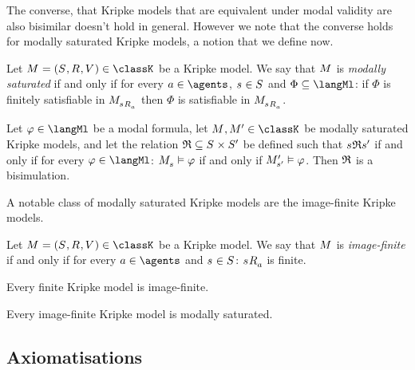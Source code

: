The converse, that Kripke models that are equivalent under modal validity are also bisimilar doesn't hold in general.
However we note that the converse holds for modally saturated Kripke models, a notion that we define now.

\begin{definition}
Let $\modelAndTuple \in \classK$ be a Kripke model.
We say that $\model$ is {\em modally saturated} if and only if for every $\agentA \in \agents$, $\stateS \in \states$ and $\Phi \subseteq \langMl$: if $\Phi$ is finitely satisfiable in $\pointedModel{\successors{\agentA}{\stateS}}$ then $\Phi$ is satisfiable in $\pointedModel{\successors{\agentA}{\stateS}}$.
\end{definition}

\begin{proposition}
Let $\phi \in \langMl$ be a modal formula,
let $\model, \model[\prime] \in \classK$ be modally saturated Kripke models, and
let the relation $\bisimulation \subseteq \states \times \states[\prime]$ be defined such that $\stateS \bisimulation \stateS[\prime]$ if and only if for every $\phi \in \langMl$: $\pointedModel{\stateS} \entails \phi$ if and only if $\pointedModel[\prime]{\stateS[\prime]} \entails \phi$.
Then $\bisimulation$ is a bisimulation.
\end{proposition}

A notable class of modally saturated Kripke models are the image-finite Kripke models.

\begin{definition}
Let $\modelAndTuple \in \classK$ be a Kripke model.
We say that $\model$ is {\em image-finite} if and only if for every $\agentA \in \agents$ and $\stateS \in \states$: $\successors{\agentA}{\stateS}$ is finite.
\end{definition}

\begin{proposition}
Every finite Kripke model is image-finite.
\end{proposition}

\begin{proposition}
Every image-finite Kripke model is modally saturated.
\end{proposition}

\subsection{Axiomatisations}

